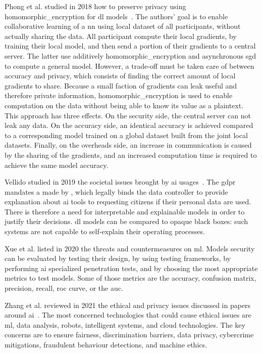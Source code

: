 Phong et al. studied in 2018 how to preserve privacy using \gls{homomorphic_encryption} for \gls{dl} models~\cite{phong_privacy-preserving_2018}. The authors' goal is to enable collaborative learning of a \gls{nn} using local dataset of all participants, without actually sharing the data. All participant compute their local \glspl{gradient}, by training their local model, and then send a portion of their \glspl{gradient} to a central server. The latter use additively \gls{homomorphic_encryption} and asynchronous \gls{sgd} to compute a general model. However, a trade-off must be taken care of between accuracy and privacy, which consists of finding the correct amount of local \glspl{gradient} to share. Because a small faction of \glspl{gradient} can leak useful and therefore private information, \gls{homomorphic_encryption} is used to enable computation on the data without being able to know its value as a \gls{plaintext}. This approach has three effects. On the security side, the central server can not leak any data. On the accuracy side, an identical accuracy is achieved compared to a corresponding model trained on a global dataset built from the joint local datasets. Finally, on the overheads side, an increase in communication is caused by the sharing of the \glspl{gradient}, and an increased computation time is required to achieve the same model accuracy. %

Vellido studied in 2019 the societal issues brought by \gls{ai} usages~\cite{vellido_societal_2019}. The \gls{gdpr} mandates a  made by , which legally binds the data controller to provide explanation about \gls{ai} tools to requesting citizens if their personal data are used. There is therefore a need for interpretable and explainable models in order to justify their decisions. \gls{dl} models can be compared to opaque black boxes: such systems are not capable to self-explain their operating processes. %

Xue et al. \cite{xue_machine_2020} listed in 2020 the threats and countermeasures on \gls{ml}. Models security can be evaluated by testing their design, by using testing \glspl{framework}, by performing \gls{ai} specialized penetration tests, and by choosing the most appropriate metrics to test models. Some of those metrics are the accuracy, confusion matrix, precision, recall, \gls{roc} curve, or the \gls{auc}.

Zhang et al. reviewed in 2021 the ethical and privacy issues discussed in papers around \gls{ai}~\cite{zhang_ethics_2021}. The most concerned technologies that could cause ethical issues are \gls{ml}, data analysis, robots, intelligent systems, and \gls{cloud} technologies. The key concerns are to ensure fairness, discrimination barriers, data privacy, cybercrime mitigations, fraudulent behaviour detections, and machine ethics. %

